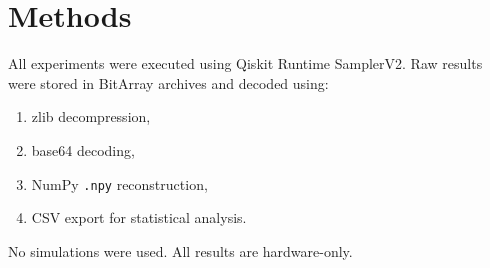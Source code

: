 \section{Methods}

All experiments were executed using Qiskit Runtime SamplerV2. Raw results were stored in BitArray archives and decoded using:

\begin{enumerate}
    \item zlib decompression,
    \item base64 decoding,
    \item NumPy \texttt{.npy} reconstruction,
    \item CSV export for statistical analysis.
\end{enumerate}

No simulations were used. All results are hardware-only.
